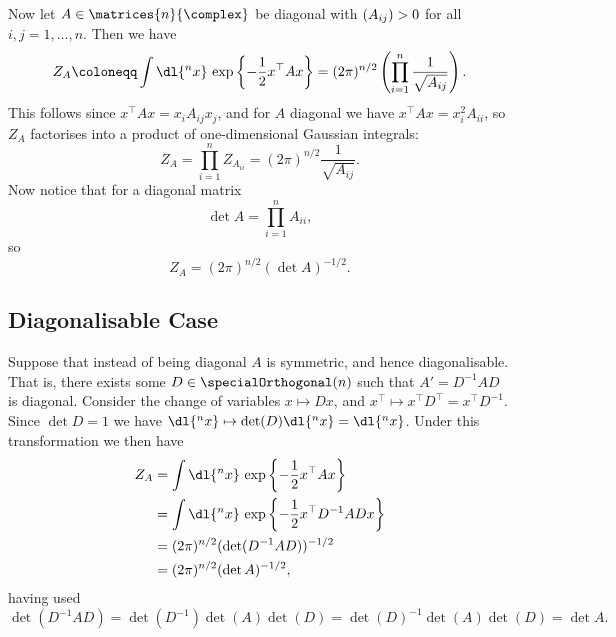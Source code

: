 \documentclass[fleqn]{NotesClass}
\let\Re\relax
\DeclareMathOperator{\Re}{Re}
\newcommand{\trans}{{\top}}
\begin{document}
    Now let \(A \in \matrices{n}{\complex}\) be diagonal with \(\Re(A_{ij}) > 0\) for all \(i, j = 1, \dotsc, n\).
    Then we have
    \begin{equation}
        Z_A \coloneqq \int \dl{^nx} \, \exp\left\{ -\frac{1}{2}x^\trans A x \right\} = (2\pi)^{n/2} \left( \prod_{i=1}^{n} \frac{1}{\sqrt{A_{ij}}} \right).
    \end{equation}
    This follows since \(x^\trans Ax = x_iA_{ij}x_j\), and for \(A\) diagonal we have \(x^\trans Ax = x_i^2A_{ii}\), so \(Z_A\) factorises into a product of one-dimensional Gaussian integrals:
    \begin{equation}
        Z_A = \prod_{i = 1}^{n} Z_{A_{ii}} = (2\pi)^{n/2} \frac{1}{\sqrt{A_{ij}}}.
    \end{equation}
    Now notice that for a diagonal matrix
    \begin{equation}
        \det A = \prod_{i = 1}^{n} A_{ii},
    \end{equation}
    so
    \begin{equation}
        Z_A = (2\pi)^{n/2} (\det A)^{-1/2}.
    \end{equation}
    
    \subsection{Diagonalisable Case}
    Suppose that instead of being diagonal \(A\) is symmetric, and hence diagonalisable.
    That is, there exists some \(D \in \specialOrthogonal(n)\) such that \(A' = D^{-1}AD\) is diagonal.
    Consider the change of variables \(x \mapsto Dx\), and \(x^\trans \mapsto x^\trans D^\trans = x^{\trans}D^{-1}\).
    Since \(\det D = 1\) we have \(\dl{^nx} \mapsto \det(D) \dl{^nx} = \dl{^nx}\).
    Under this transformation we then have
    \begin{align}
        Z_A &= \int \dl{^nx} \, \exp\left\{ -\frac{1}{2}x^\trans Ax \right\}\\
        &= \int \dl{^nx} \, \exp\left\{ -\frac{1}{2}x^\trans D^{-1}ADx \right\}\\
        &= (2\pi)^{n/2}(\det(D^{-1}AD))^{-1/2}\\
        &= (2\pi)^{n/2} (\det A)^{-1/2},
    \end{align}
    having used
    \begin{equation*}
        \det(D^{-1}AD) = \det(D^{-1})\det(A)\det(D) = \det(D)^{-1}\det(A)\det(D) = \det A.
    \end{equation*}
    
\end{document}
